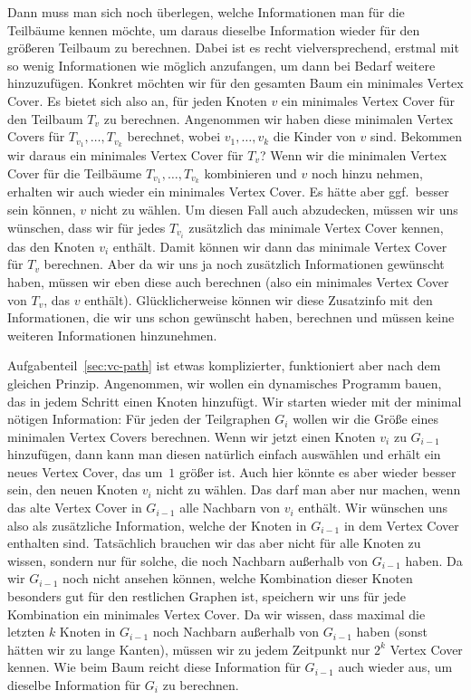 Dann muss man sich noch überlegen, welche Informationen man für die
Teilbäume kennen möchte, um daraus dieselbe Information wieder für den
größeren Teilbaum zu berechnen.  Dabei ist es recht vielversprechend,
erstmal mit so wenig Informationen wie möglich anzufangen, um dann bei
Bedarf weitere hinzuzufügen.  Konkret möchten wir für den gesamten
Baum ein minimales Vertex Cover.  Es bietet sich also an, für jeden
Knoten $v$ ein minimales Vertex Cover für den Teilbaum $T_v$ zu
berechnen.  Angenommen wir haben diese minimalen Vertex Covers für
$T_{v_1}, \dots, T_{v_k}$ berechnet, wobei $v_1, \dots, v_k$ die
Kinder von $v$ sind.  Bekommen wir daraus ein minimales Vertex Cover
für $T_v$?  Wenn wir die minimalen Vertex Cover für die Teilbäume
$T_{v_1}, \dots, T_{v_k}$ kombinieren und $v$ noch hinzu nehmen,
erhalten wir auch wieder ein minimales Vertex Cover.  Es hätte aber
ggf.\ besser sein können, $v$ nicht zu wählen.  Um diesen Fall auch
abzudecken, müssen wir uns wünschen, dass wir für jedes $T_{v_i}$
zusätzlich das minimale Vertex Cover kennen, das den Knoten $v_i$
enthält.  Damit können wir dann das minimale Vertex Cover für $T_v$
berechnen.  Aber da wir uns ja noch zusätzlich Informationen gewünscht
haben, müssen wir eben diese auch berechnen (also ein minimales
Vertex Cover von $T_v$, das $v$ enthält).  Glücklicherweise können wir
diese Zusatzinfo mit den Informationen, die wir uns schon gewünscht
haben, berechnen und müssen keine weiteren Informationen hinzunehmen.

Aufgabenteil~\ref{sec:vc-path} ist etwas komplizierter, funktioniert
aber nach dem gleichen Prinzip.  Angenommen, wir wollen ein
dynamisches Programm bauen, das in jedem Schritt einen Knoten
hinzufügt.  Wir starten wieder mit der minimal nötigen Information:
Für jeden der Teilgraphen $G_i$ wollen wir die Größe eines minimalen
Vertex Covers berechnen.  Wenn wir jetzt einen Knoten $v_i$ zu
$G_{i-1}$ hinzufügen, dann kann man diesen natürlich einfach auswählen
und erhält ein neues Vertex Cover, das um~$1$ größer ist.  Auch hier
könnte es aber wieder besser sein, den neuen Knoten $v_i$ nicht zu
wählen.  Das darf man aber nur machen, wenn das alte Vertex Cover in
$G_{i-1}$ alle Nachbarn von $v_i$ enthält.  Wir wünschen uns also als
zusätzliche Information, welche der Knoten in $G_{i-1}$ in dem Vertex
Cover enthalten sind.  Tatsächlich brauchen wir das aber nicht für
alle Knoten zu wissen, sondern nur für solche, die noch Nachbarn
außerhalb von $G_{i-1}$ haben.  Da wir $G_{i-1}$ noch nicht ansehen
können, welche Kombination dieser Knoten besonders gut für den
restlichen Graphen ist, speichern wir uns für jede Kombination ein
minimales Vertex Cover.  Da wir wissen, dass maximal die letzten $k$
Knoten in $G_{i-1}$ noch Nachbarn außerhalb von $G_{i-1}$ haben (sonst
hätten wir zu lange Kanten), müssen wir zu jedem Zeitpunkt nur $2^k$
Vertex Cover kennen.  Wie beim Baum reicht diese Information für
$G_{i-1}$ auch wieder aus, um dieselbe Information für $G_i$ zu
berechnen.

